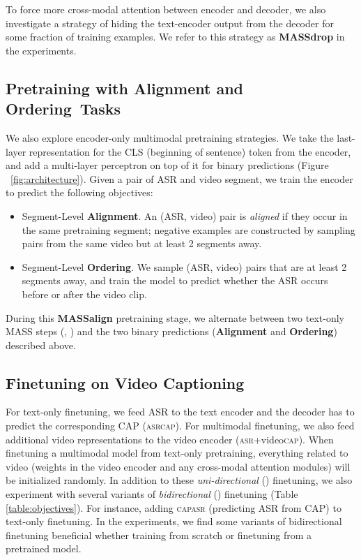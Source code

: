 \documentclass[11pt,a4paper]{article}
\begin{document}
To force more cross-modal attention between encoder and decoder,
we also investigate a strategy of hiding the text-encoder output from the decoder for some fraction of training examples.
We refer to this strategy as \textbf{MASSdrop} in the experiments.



\subsection{Pretraining with Alignment and Ordering~Tasks}

We also explore encoder-only multimodal pretraining strategies.
We take the last-layer representation for the CLS (beginning of sentence) token from the encoder, and add a multi-layer perceptron on top of it for binary predictions (Figure ~\ref{fig:architecture}).
Given a pair of ASR and video segment, we train the encoder to predict the following objectives:
\vspace{-0.5em}
\begin{itemize}
\setlength\itemsep{-0em}
  \item Segment-Level \textbf{Alignment}. An (ASR, video) pair is \textit{aligned} if they occur in the same pretraining segment; negative examples are constructed by sampling pairs from the same video but at least 2 segments away.
  \item Segment-Level \textbf{Ordering}.  We sample (ASR, video) pairs that are at least 2 segments away, and train the model to predict whether the ASR occurs before or after the video clip.
\end{itemize}





During this \textbf{MASSalign} pretraining stage, we alternate between two text-only MASS steps (\CAPtoCAP, \ASRtoASR) and the two binary predictions (\textbf{Alignment} and \textbf{Ordering}) described above.


\subsection{Finetuning on Video Captioning}



For text-only finetuning, we feed ASR to the text encoder and the decoder has to predict the corresponding CAP (\textsc{asr}\textsc{cap}). For multimodal finetuning, we also feed additional video representations to the video encoder (\textsc{asr}+video\textsc{cap}).  When finetuning a multimodal model from text-only pretraining, everything related to video (weights in the video encoder and any cross-modal attention modules) will be initialized randomly.
In addition to these \textit{uni-directional} (\textbf{\unimt}) finetuning, 
we also experiment with several variants of \textit{bidirectional}  (\textbf{\bimt}) finetuning (Table \ref{table:objectives}). For instance, adding \textsc{cap}\textsc{asr} (predicting ASR from CAP) to text-only finetuning.
In the experiments, we find some variants of bidirectional finetuning beneficial whether training from scratch or finetuning from a pretrained model.
\end{document}
